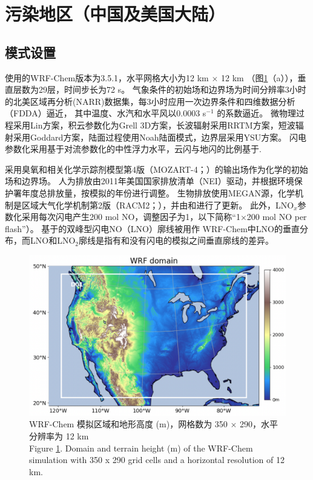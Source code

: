 \section{污染地区（中国及美国大陆）}

\subsection{模式设置}

使用的WRF-Chem版本为3.5.1，水平网格大小为12 km $\times$ 12 km （图\ref{fig:us_domain}（a）），垂直层数为29层，时间步长为72 s。
气象条件的初始场和边界场为时间分辨率3小时的北美区域再分析(NARR)数据集，每3小时应用一次边界条件和四维数据分析（FDDA）逼近，
其中温度、水汽和水平风以0.0003 s$^{-1}$ 的系数逼近\citep{Laughner.2017}。
微物理过程采用Lin方案\citep{Lin.1983}，积云参数化为Grell 3D方案\citep{Grell.1993a,Grell.2002a}，长波辐射采用RRTM方案\citep{Iacono.2008}，短波辐射采用Goddard方案，陆面过程使用Noah陆面模式\citep{Koren.1999}，边界层采用YSU方案\citep{Hong.2006}。
闪电参数化采用基于对流参数化的中性浮力水平\citep{Pickering.1992}，云闪与地闪的比例基于\citet{Boccippio.2001}.

采用臭氧和相关化学示踪剂模型第4版（MOZART-4；\citet{Emmons.2010}）的输出场作为化学的初始场和边界场。
人为排放由2011年美国国家排放清单（NEI）驱动，并根据环境保护署年度总排放量，按模拟的年份进行调整\citep{EPA.2015}。
生物排放使用MEGAN源，化学机制是区域大气化学机制第2版（RACM2；\citet{Goliff.2013}），并由\citet{Browne.2014}和\citet{Schwantes.2015}进行了更新。
此外，LNO$_x$参数化采用每次闪电产生200 mol NO，调整因子为1，以下简称“1$\times$200 mol NO per flash”）。
基于\citet{Ott.2010}的双峰型闪电NO（LNO）廓线\citep{Laughner.2017}被用作 WRF-Chem中LNO的垂直分布，而LNO和LNO$_2$廓线是指有和没有闪电的模拟之间垂直廓线的差异。


\begin{figure}[htbp]
\centering
\includegraphics[width=12cm]{./figures/us_domain.png}
\caption{WRF-Chem 模拟区域和地形高度 (m)，网格数为 350 $\times$ 290，水平分辨率为 12 km \\
Figure \ref{fig:us_domain}. Domain and terrain height (m) of the WRF-Chem simulation with 350 x 290 grid cells and a horizontal resolution of 12 km.}
\label{fig:us_domain}
\end{figure}



